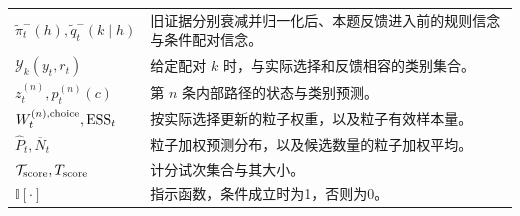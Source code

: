 \documentclass[12pt]{article}
\newcommand{\ind}{\mathbb I}
\begin{document}
{\begin{longtable}{L{4.5cm}L{9.5cm}}
$\widetilde\pi_t^-(h),\widetilde q_t^-(k\mid h)$ & 旧证据分别衰减并归一化后、本题反馈进入前的规则信念与条件配对信念。\\
$\mathcal Y_k(y_t,r_t)$ & 给定配对 $k$ 时，与实际选择和反馈相容的类别集合。\\
$z_t^{(n)},p_t^{(n)}(c)$ & 第 $n$ 条内部路径的状态与类别预测。\\
$W_t^{(n),{\rm choice}},\mathrm{ESS}_t$ & 按实际选择更新的粒子权重，以及粒子有效样本量。\\
$\widehat P_t,\overline N_t$ & 粒子加权预测分布，以及候选数量的粒子加权平均。\\
$\mathcal T_{\rm score},T_{\rm score}$ & 计分试次集合与其大小。\\
$\ind[\cdot]$ & 指示函数，条件成立时为1，否则为0。\\
\bottomrule
\end{longtable}
}
\end{document}
